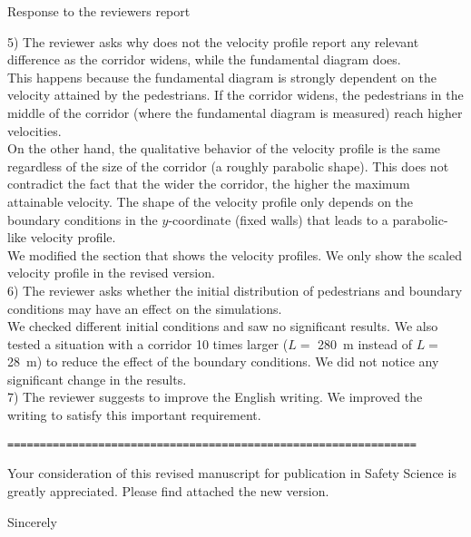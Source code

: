 \documentclass[a4paper,12pt]{letter}
\begin{document}
\begin{letter}{Response to the reviewers report}
{5) The reviewer asks why does not the velocity profile report any relevant difference as the corridor widens, while the fundamental diagram does.\\

This happens because the fundamental diagram is strongly dependent on the velocity attained by the pedestrians. If the corridor widens, the pedestrians in the middle of the corridor (where the fundamental diagram is measured) reach higher velocities. \\

On the other hand, the qualitative behavior of the velocity profile is the same regardless of the size of the corridor (a roughly parabolic shape). This does not contradict the fact that the wider the corridor, the higher the maximum attainable velocity. The shape of the velocity profile only depends on the boundary conditions in the $y$-coordinate (fixed walls) that leads to a parabolic-like velocity profile. \\

We modified the section that shows the velocity profiles.  We only show the scaled velocity profile in the revised version. \\

6) The reviewer asks whether the initial distribution of pedestrians and boundary conditions may have an effect on the simulations.\\

We checked different initial conditions and saw no significant results. We also tested a situation with a corridor 10 times larger ($L =$ 280~m instead of $L =$ 28~m) to reduce the effect of the boundary conditions. We did not notice any significant change in the results. \\

7) The reviewer suggests to improve the English writing. We improved the writing to satisfy this important requirement.  \\

\begin{verbatim}
===============================================================
\end{verbatim}

}

\newpage

Your consideration of this revised manuscript for publication in 
Safety Science is greatly appreciated. 
Please find attached the new version. \\

\signature{Ignacio Sticco, Guillermo Frank, Fernando Cornes and Claudio Dorso}
\closing{Sincerely}




\end{letter}
\end{document}
